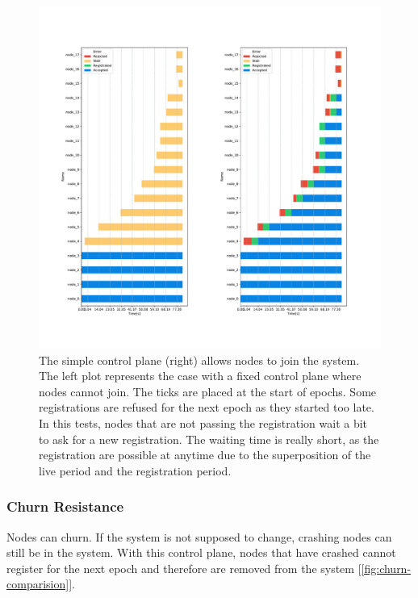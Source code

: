 \documentclass[a4paper,11pt,twoside,openright]{report}
\begin{document}
\begin{figure}[!h] 
\centering
\includegraphics[width=450pt]{figures/JoinSubplots}
\caption{The simple control plane (right) allows nodes to join the system. The left plot
 represents the case with a fixed control plane where nodes cannot join. The ticks are placed at the start of epochs. Some registrations are refused for the next epoch as they started too late. In this tests, nodes that are not passing the registration wait a bit to ask for a new registration. The waiting time is really short, as the registration are possible at anytime due to the superposition of the live period and the registration period. }
 \label{fig:insertion-comparision}
\end{figure}

\subsubsection{Churn Resistance}
Nodes can churn. If the system is not supposed to change, crashing nodes can still be
in the system. With this control plane, nodes that have crashed cannot
register for the next epoch and therefore are removed from the system [\autoref{fig:churn-comparision}]. 
\end{document}

